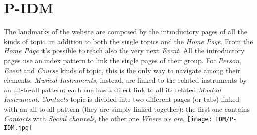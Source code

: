\documentclass[../../DD.tex]{subfiles}
\begin{document}
\section{P-IDM}
	The landmarks of the website are composed by the introductory pages of all the kinds of topic, in addition to both the single topics and the \textit{Home Page}. From the \textit{Home Page} it's possible to reach also the very next \textit{Event}.
	\newline
	All the introductory pages use an index pattern to link the single pages of their group. For \textit{Person}, \textit{Event} and \textit{Course} kinds of topic, this is the only way to navigate among their elements. \textit{Musical Instruments}, instead, are linked to the related instruments by an all-to-all pattern: each one has a direct link to all its related \textit{Musical Instrument}.
	\newline
	\textit{Contacts} topic is divided into two different pages (or tabs) linked with an all-to-all pattern (they are simply linked together): the first one contains \textit{Contacts} with \textit{Social channels}, the other one \textit{Where we are}.
	\newline
	\texttt{[image: IDM/P-IDM.jpg]}
\end{document}
